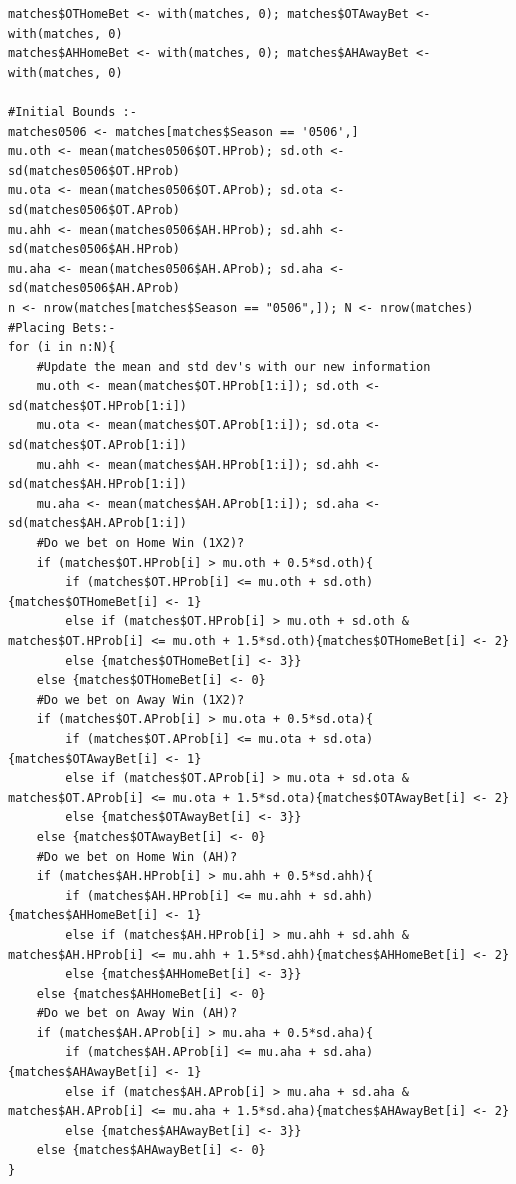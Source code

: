 \documentclass[a4paper,10pt]{report}
\begin{document}
\begin{lstlisting}
matches$OTHomeBet <- with(matches, 0); matches$OTAwayBet <- with(matches, 0)
matches$AHHomeBet <- with(matches, 0); matches$AHAwayBet <- with(matches, 0)

#Initial Bounds :-
matches0506 <- matches[matches$Season == '0506',]
mu.oth <- mean(matches0506$OT.HProb); sd.oth <- sd(matches0506$OT.HProb)
mu.ota <- mean(matches0506$OT.AProb); sd.ota <- sd(matches0506$OT.AProb)
mu.ahh <- mean(matches0506$AH.HProb); sd.ahh <- sd(matches0506$AH.HProb)
mu.aha <- mean(matches0506$AH.AProb); sd.aha <- sd(matches0506$AH.AProb)
n <- nrow(matches[matches$Season == "0506",]); N <- nrow(matches)
#Placing Bets:-
for (i in n:N){
	#Update the mean and std dev's with our new information
	mu.oth <- mean(matches$OT.HProb[1:i]); sd.oth <- sd(matches$OT.HProb[1:i])
	mu.ota <- mean(matches$OT.AProb[1:i]); sd.ota <- sd(matches$OT.AProb[1:i])
	mu.ahh <- mean(matches$AH.HProb[1:i]); sd.ahh <- sd(matches$AH.HProb[1:i])
	mu.aha <- mean(matches$AH.AProb[1:i]); sd.aha <- sd(matches$AH.AProb[1:i])
	#Do we bet on Home Win (1X2)?
	if (matches$OT.HProb[i] > mu.oth + 0.5*sd.oth){
		if (matches$OT.HProb[i] <= mu.oth + sd.oth){matches$OTHomeBet[i] <- 1}
		else if (matches$OT.HProb[i] > mu.oth + sd.oth & matches$OT.HProb[i] <= mu.oth + 1.5*sd.oth){matches$OTHomeBet[i] <- 2}
		else {matches$OTHomeBet[i] <- 3}}
	else {matches$OTHomeBet[i] <- 0}
	#Do we bet on Away Win (1X2)?
	if (matches$OT.AProb[i] > mu.ota + 0.5*sd.ota){
		if (matches$OT.AProb[i] <= mu.ota + sd.ota){matches$OTAwayBet[i] <- 1}
		else if (matches$OT.AProb[i] > mu.ota + sd.ota & matches$OT.AProb[i] <= mu.ota + 1.5*sd.ota){matches$OTAwayBet[i] <- 2}
		else {matches$OTAwayBet[i] <- 3}}
	else {matches$OTAwayBet[i] <- 0}
	#Do we bet on Home Win (AH)?
	if (matches$AH.HProb[i] > mu.ahh + 0.5*sd.ahh){
		if (matches$AH.HProb[i] <= mu.ahh + sd.ahh){matches$AHHomeBet[i] <- 1}
		else if (matches$AH.HProb[i] > mu.ahh + sd.ahh & matches$AH.HProb[i] <= mu.ahh + 1.5*sd.ahh){matches$AHHomeBet[i] <- 2}
		else {matches$AHHomeBet[i] <- 3}}
	else {matches$AHHomeBet[i] <- 0}
	#Do we bet on Away Win (AH)?
	if (matches$AH.AProb[i] > mu.aha + 0.5*sd.aha){
		if (matches$AH.AProb[i] <= mu.aha + sd.aha){matches$AHAwayBet[i] <- 1}
		else if (matches$AH.AProb[i] > mu.aha + sd.aha & matches$AH.AProb[i] <= mu.aha + 1.5*sd.aha){matches$AHAwayBet[i] <- 2}
		else {matches$AHAwayBet[i] <- 3}}
	else {matches$AHAwayBet[i] <- 0}
}
\end{lstlisting} 
\end{document}
